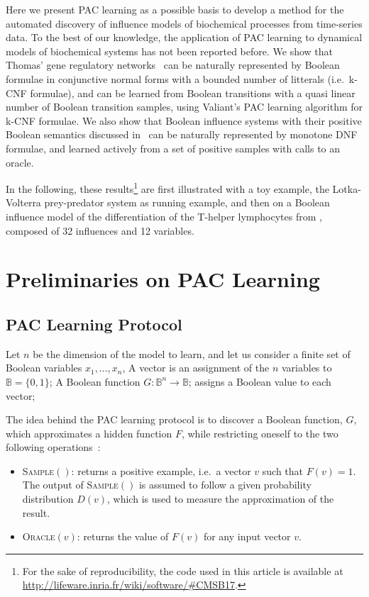 \documentclass{llncs}
\begin{document}
Here we present PAC learning as a possible basis to develop a method for the automated discovery of influence models of biochemical processes from time-series data. 
To the best of our knowledge, 
the application of PAC learning to dynamical models of biochemical systems has not been reported before.
We show that Thomas' gene regulatory networks~\cite{Thomas91jtb,Thomas73jtb} can be naturally represented by 
Boolean formulae in conjunctive normal forms with a bounded number of litterals (i.e.~k-CNF formulae),
and can be learned from Boolean transitions with a quasi linear number of Boolean transition samples, using Valiant's PAC learning algorithm for k-CNF formulae.
We also show that Boolean influence systems with their positive Boolean semantics discussed in~\cite{FMRS16cmsb}
can be naturally represented by monotone DNF formulae,
and learned actively from a set of positive samples with calls to an oracle.

In the following, these results\footnote{For the sake of reproducibility, the code used in this article is available at \url{http://lifeware.inria.fr/wiki/software/\#CMSB17}.} are first illustrated with a toy example, the Lotka-Volterra prey-predator system as running example,
and then on a Boolean influence model of 
the differentiation of the T-helper lymphocytes from \cite{RRMTC06tcsb,Mendoza06biosystems},
composed of 32 influences and 12 variables.


\section{Preliminaries on PAC Learning}\label{pac}

\subsection{PAC Learning Protocol}

Let $n$ be the dimension of the model to learn, and let us consider a finite set of Boolean variables $x_1,\ldots,x_n$,
 A vector is an assignment of the $n$ variables to  $\mathbb{B} = \{0,1\}$;
 A Boolean function $G:{\mathbb{B}}^n \rightarrow \mathbb{B}$;
	assigns a Boolean value to each vector;


The idea behind the PAC learning protocol is to discover a Boolean function, $G$, which approximates a hidden function $F$, while restricting oneself to the two following operations~:
\begin{itemize}
  \item
\textsc{Sample}$()$: returns a positive example, i.e.~a vector $v$ such that $F(v)=1$.
The output of \textsc{Sample}$()$ is assumed to follow a given probability distribution $D(v)$, which is used to measure the approximation of the result.
  \item
\textsc{Oracle}$(v)$: returns the value of $F(v)$ for any input vector $v$.
\end{itemize}
\end{document}
